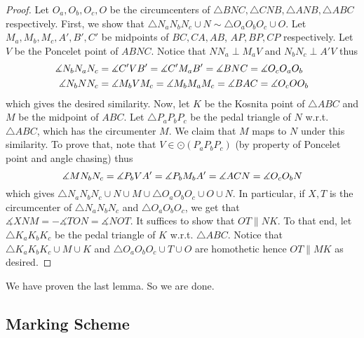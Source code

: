 \begin{proof}
    Let $O_a, O_b, O_c, O$ be the circumcenters of $\triangle BNC, \triangle CNB, \triangle ANB, \triangle ABC$ respectively. First, we show that $\triangle N_aN_bN_c\cup N\sim\triangle O_aO_bO_c\cup O$. Let $M_a, M_b, M_c, A', B', C'$ be midpoints of $BC, CA, AB$, $AP, BP, CP$ respectively. Let $V$ be the Poncelet point of $ABNC$. Notice that $NN_a\perp M_aV$ and $N_bN_c\perp A'V$ thus
    \begin{align*}
        \measuredangle N_bN_aN_c &= \measuredangle C'VB' = \measuredangle C'M_aB' = \measuredangle BNC = \measuredangle O_cO_aO_b \\
        \measuredangle N_bNN_c &= \measuredangle M_bVM_c = \measuredangle M_bM_aM_c = \measuredangle BAC = \measuredangle O_cOO_b
    \end{align*}
    which gives the desired similarity. Now, let $K$ be the Kosnita point of $\triangle ABC$ and $M$ be the midpoint of $ABC$. Let $\triangle P_aP_bP_c$ be the pedal triangle of $N$ w.r.t. $\triangle ABC$, which has the circumenter $M$. We claim that $M$ maps to $N$ under this similarity. To prove that, note that $V\in\odot(P_aP_bP_c)$ (by property of Poncelet point and angle chasing) thus
    $$\measuredangle MN_bN_c = \measuredangle P_bVA' = \measuredangle P_bM_bA' = \measuredangle ACN = \measuredangle O_cO_bN$$
    which gives $\triangle N_aN_bN_c\cup N\cup M\cup\triangle O_aO_bO_c\cup O\cup N$. In particular, if $X, T$ is the circumcenter of $\triangle N_aN_bN_c$ and $\triangle O_aO_bO_c$, we get that $\measuredangle XNM = -\measuredangle TON = \measuredangle NOT$. It suffices to show that $OT\parallel NK$.
    \nl To that end, let $\triangle K_aK_bK_c$ be the pedal triangle of $K$ w.r.t. $\triangle ABC$. Notice that $\triangle K_aK_bK_c\cup M\cup K$ and $\triangle O_aO_bO_c\cup T\cup O$ are homothetic hence $OT\parallel MK$ as desired.
\end{proof}
\noindent We have proven the last lemma. So we are done.
\subsection{Marking Scheme}
